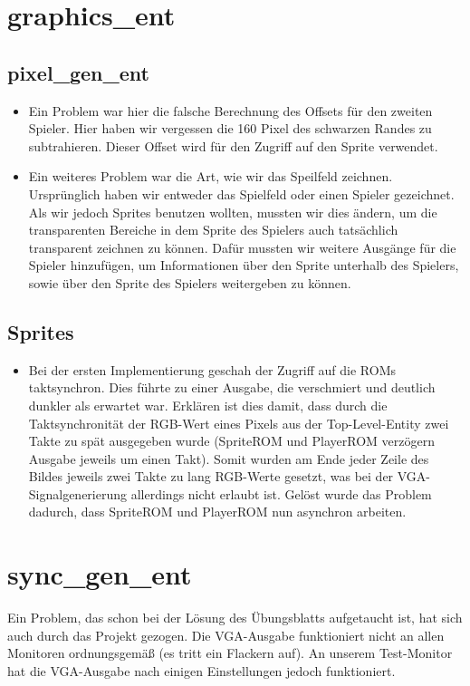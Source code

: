 \documentclass[parskip=full]{scrartcl}
\begin{document}
		\section{graphics\_ent}

			\subsection{pixel\_gen\_ent}
				\begin{itemize}
					\item Ein Problem war hier die falsche Berechnung des Offsets für den zweiten Spieler. Hier haben wir vergessen die 160 Pixel des schwarzen Randes zu subtrahieren. Dieser Offset wird für den Zugriff auf den Sprite verwendet.
					\item Ein weiteres Problem war die Art, wie wir das Speilfeld zeichnen. Ursprünglich haben wir entweder das Spielfeld oder einen Spieler gezeichnet. Als wir jedoch Sprites benutzen wollten, mussten wir dies ändern, um die transparenten Bereiche in dem Sprite des Spielers auch tatsächlich transparent zeichnen zu können. Dafür mussten wir weitere Ausgänge für die Spieler hinzufügen, um Informationen über den Sprite unterhalb des Spielers, sowie über den Sprite des Spielers weitergeben zu können.
				\end{itemize}
			
			\subsection{Sprites}
				\begin{itemize}
					\item Bei der ersten Implementierung geschah der Zugriff auf die ROMs taktsynchron. Dies führte zu einer Ausgabe, die verschmiert und deutlich dunkler als erwartet war. Erklären ist dies damit, dass durch die Taktsynchronität der RGB-Wert eines Pixels aus der Top-Level-Entity zwei Takte zu spät ausgegeben wurde (SpriteROM und PlayerROM verzögern Ausgabe jeweils um einen Takt). Somit wurden am Ende jeder Zeile des Bildes jeweils zwei Takte zu lang RGB-Werte gesetzt, was bei der VGA-Signalgenerierung allerdings nicht erlaubt ist.
					Gelöst wurde das Problem dadurch, dass SpriteROM und PlayerROM nun asynchron arbeiten.
				\end{itemize}
	
		
		\section{sync\_gen\_ent}
			Ein Problem, das schon bei der Lösung des Übungsblatts aufgetaucht ist, hat sich auch durch das Projekt gezogen.
			Die VGA-Ausgabe funktioniert nicht an allen Monitoren ordnungsgemäß (es tritt ein Flackern auf). An unserem Test-Monitor hat die VGA-Ausgabe nach einigen Einstellungen jedoch funktioniert.
\end{document}
